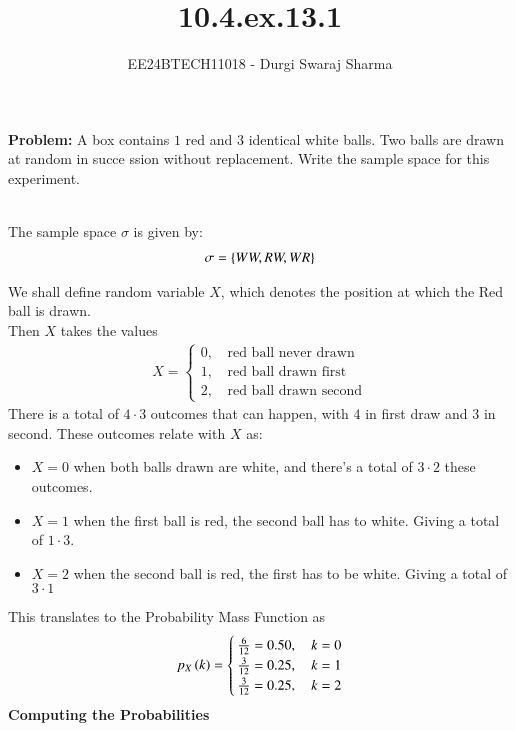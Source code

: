 \documentclass[journal]{IEEEtran}
\begin{document}

\vspace{3cm}

\title{10.4.ex.13.1}
\author{EE24BTECH11018 - Durgi Swaraj Sharma}

{\let\newpage\relax\maketitle}
\renewcommand{\thefigure}{\theenumi}
\renewcommand{\thetable}{\theenumi}
\setlength{\intextsep}{10pt}
\renewcommand{\thetable}{\theenumi}
\textbf{Problem:} A box contains $1$ red and $3$ identical white balls. Two balls are drawn at random in succe
ssion without replacement. Write the sample space for this experiment.\\
\\
\solution

The sample space $\sigma$ is given by:
\begin{align}
  \sigma = \left\{WW, RW, WR\right\}
\end{align}

We shall define random variable $X$, which denotes the position at which the Red ball is drawn. \\
Then $X$ takes the values
\begin{align}
  X = 
  \begin{cases}
    0 ,&\, \text{red ball never drawn}\\
    1 ,&\, \text{red ball drawn first}\\
    2 ,&\, \text{red ball drawn second}
  \end{cases}
\end{align}
There is a total of $4\cdot3$ outcomes that can happen, with $4$ in first draw and $3$ in second.
These outcomes relate with $X$ as:
\begin{itemize}
  \item $X=0$ when both balls drawn are white, and there's a total of $3\cdot2$ these outcomes.
  \item $X=1$ when the first ball is red, the second ball has to white. Giving a total of $1\cdot3$.
  \item $X=2$ when the second ball is red, the first has to be white. Giving a total of $3\cdot1$
\end{itemize}
This translates to the Probability Mass Function as 
\begin{align}
  p_X\left(k\right) = 
  \begin{cases}
    \frac{6}{12} = 0.50,\,& k = 0\\
    \frac{3}{12} = 0.25,\,& k = 1\\
    \frac{3}{12} = 0.25,\,& k = 2
  \end{cases}
\end{align}
\textbf{Computing the Probabilities}
\end{document}
